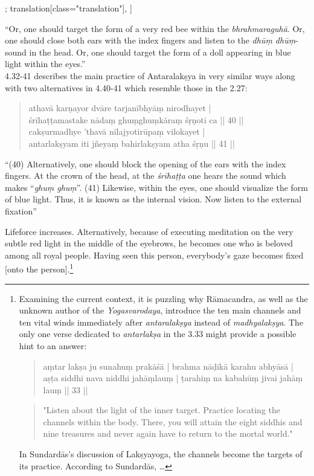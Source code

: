 \begin{alignment}[
  texts=edition[class="edition"];
  translation[class="translation"],
  ]
\begin{translation}
\begin{tlate}
{        ``Or, one should target the form of a very red bee within the \textit{bhrahmaraguhā}. Or, one should close both ears with the index fingers and listen to the \textit{dhūṃ dhūṃ}-sound in the head. Or, one should target the form of a doll appearing in blue light within the eyes.''\\
 4.32-41 describes the main practice of Antaralakṣya in very similar ways along with two alternatives in 4.40-41 which resemble those in the  2.27:   
\begin{quote}
athavā karṇayor dvāre tarjanībhyāṃ nirodhayet |\\
śrīhaṭṭamastake nādaṃ ghuṃghuṃkāraṃ śṛṇoti ca || 40 || \\ 
cakṣurmadhye 'thavā nīlajyotirūpaṃ vilokayet | \\
antarlakṣyam iti jñeyaṃ bahirlakṣyam atha śṛṇu || 41 ||
\end{quote}
``(40) Alternatively, one should block the opening of the ears with the index fingers. At the crown of the head, at the \textit{śrīhaṭṭa} one hears the sound which makes ``\textit{ghuṃ ghuṃ}''. (41) Likewise, within the eyes, one should visualize the form of blue light. Thus, it is known as the internal vision. Now listen to the external fixation''} Lifeforce increases. Alternatively, because of executing meditation on the very subtle red light in the middle of the eyebrows, he becomes one who is beloved among all royal people. Having seen this person, everybody's gaze becomes fixed [onto the person].\textsuperscript{\coro{[\lowroman{9}]}}\footnote{Examining the current context, it is puzzling why Rāmacandra, as well as the unknown author of the \textit{Yogasvarodaya}, introduce the ten main channels and ten vital winds immediately after \textit{antaralakṣya} instead of \textit{madhyalakṣya}. The only one verse dedicated to \textit{antarlakṣa} in the  3.33 might provide a possible hint to an answer:
  \begin{quote}
    aṃtar lakṣa ju sunahuṃ prakāśā | brahma nāḍikā karahu abhyāsā |\\
    aṣṭa siddhi nava niddhi jahāṃlauṃ | ṭarahiṃ na kabahūṃ jivai jahāṃ lauṃ || 33 ||
  \end{quote}
  \begin{quote}
    "Listen about the light of the inner target. Practice locating the channels within the body. There, you will attain the eight siddhis and nine treasures and never again have to return to the mortal world."
  \end{quote} In Sundardās's discussion of Lakṣyayoga, the channels become the targets of its practice. According to Sundardās, \ldots}
    \end{tlate}
  \end{translation}
\end{alignment}
